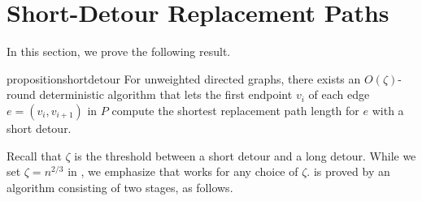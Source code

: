 \section{Short-Detour Replacement Paths}
\label{sec:short}


In this section, we prove the following result. %




\begin{restatable}{proposition}{shortdetour}
\label{thm:shortdetour}
For unweighted directed graphs, there exists an $O(\zeta)$-round deterministic algorithm that lets the first endpoint $v_i$ of each edge $e=(v_i, v_{i+1})$ in $P$ compute the shortest replacement path length for $e$ with a short detour.
\end{restatable}

Recall that $\zeta$ is the threshold between a short detour and a long detour. While we set  $\zeta=n^{2/3}$ in , we emphasize that  works for any choice of $\zeta$.  is proved by an algorithm consisting of two stages, as follows. 

